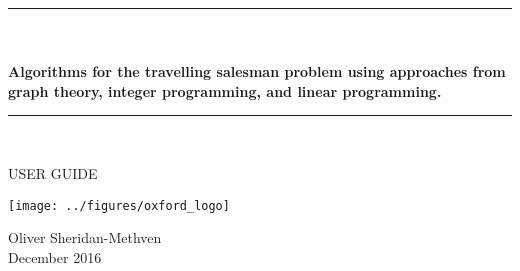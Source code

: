 \begin{center}
\begin{huge}
\rule{\linewidth}{1pt} \\	
\hfill \\	
\textbf{
Algorithms for the travelling salesman problem using approaches from graph theory, integer programming, and linear programming.
} \\ 
\rule{\linewidth}{1pt} \\
\end{huge}
\vspace{1cm}
\begin{huge}
USER GUIDE \\
\end{huge}
\vspace{1cm}
\texttt{[image: ../figures/oxford\_logo]} \\
\vspace{2cm}
\begin{Large}
Oliver Sheridan-Methven \\
\vspace{2cm}
December 2016
\end{Large}
\end{center}
\clearpage